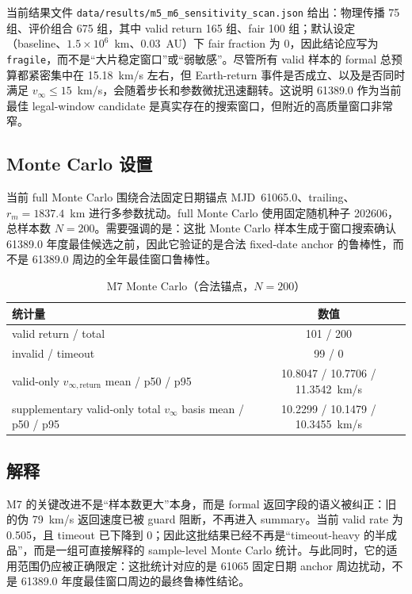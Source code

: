 \documentclass[12pt,a4paper]{ctexart}
\begin{document}
当前结果文件 \texttt{data/results/m5\_m6\_sensitivity\_scan.json} 给出：物理传播 75 组、评价组合 675 组，其中 valid return 165 组、fair 100 组；默认设定（baseline、$1.5\times10^6$~km、$0.03$~AU）下 fair fraction 为 0，因此结论应写为 \texttt{fragile}，而不是“大片稳定窗口”或“弱敏感”。尽管所有 valid 样本的 formal 总预算都紧密集中在 15.18~km/s 左右，但 Earth-return 事件是否成立、以及是否同时满足 $v_{\infty}\le 15$~km/s，会随着步长和参数微扰迅速翻转。这说明 61389.0 作为当前最佳 legal-window candidate 是真实存在的搜索窗口，但附近的高质量窗口非常窄。

\subsection{Monte Carlo 设置}
当前 full Monte Carlo 围绕合法固定日期锚点 MJD~61065.0、trailing、$r_m=1837.4$~km 进行多参数扰动。full Monte Carlo 使用固定随机种子 202606，总样本数 $N=200$。需要强调的是：这批 Monte Carlo 样本生成于窗口搜索确认 61389.0 年度最佳候选之前，因此它验证的是合法 fixed-date anchor 的鲁棒性，而不是 61389.0 周边的全年最佳窗口鲁棒性。

\begin{table}[H]
\centering
\caption{M7 Monte Carlo（合法锚点，$N=200$）}
\begin{tabular}{lc}
\toprule
统计量 & 数值 \\
\midrule
valid return / total & 101 / 200 \\
invalid / timeout & 99 / 0 \\
valid-only $v_{\infty,\text{return}}$ mean / p50 / p95 & 10.8047 / 10.7706 / 11.3542~km/s \\
supplementary valid-only total $v_{\infty}$ basis mean / p50 / p95 & 10.2299 / 10.1479 / 10.3455~km/s \\
\bottomrule
\end{tabular}
\end{table}

\subsection{解释}
M7 的关键改进不是“样本数更大”本身，而是 formal 返回字段的语义被纠正：旧的伪 79~km/s 返回速度已被 guard 阻断，不再进入 summary。当前 valid rate 为 0.505，且 timeout 已下降到 0；因此这批结果已经不再是“timeout-heavy 的半成品”，而是一组可直接解释的 sample-level Monte Carlo 统计。与此同时，它的适用范围仍应被正确限定：这批统计对应的是 61065 固定日期 anchor 周边扰动，不是 61389.0 年度最佳窗口周边的最终鲁棒性结论。
\end{document}
